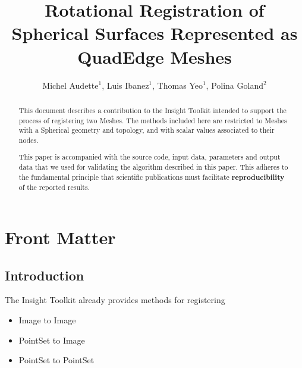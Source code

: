 \documentclass{InsightArticle}
\title{Rotational Registration of Spherical Surfaces Represented as QuadEdge Meshes}
\author{Michel Audette$^{1}$, Luis Ibanez$^{1}$, Thomas Yeo$^{1}$, Polina Goland$^{2}$}
\newcommand{\IJhandlerIDnumber}{1338}
\begin{document}
%
% 
\IJhandlefooter{\IJhandlerIDnumber}


\ifpdf
\else
\fi


\maketitle


\ifhtml
\chapter*{Front Matter\label{front}}
\fi


\begin{abstract}
\noindent
This document describes a contribution to the Insight Toolkit intended to
support the process of registering two Meshes.  The methods included here are
restricted to Meshes with a Spherical geometry and topology, and with scalar
values associated to their nodes.

This paper is accompanied with the source code, input data, parameters and
output data that we used for validating the algorithm described in this paper.
This adheres to the fundamental principle that scientific publications must
facilitate \textbf{reproducibility} of the reported results.
\end{abstract}

\tableofcontents

\section{Introduction}

The Insight Toolkit already provides methods for registering

\begin{itemize}
\item Image to Image
\item PointSet to Image
\item PointSet to PointSet
\end{itemize}
\end{document}
